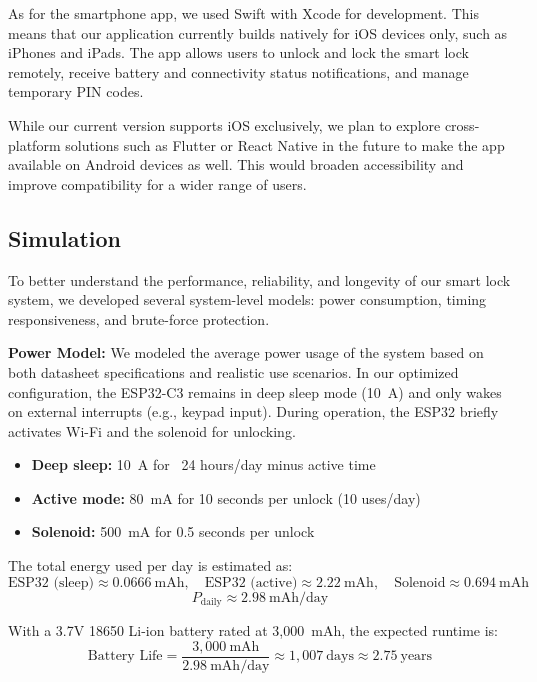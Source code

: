 As for the smartphone app, we used Swift with Xcode for development. This means that our application currently builds natively for iOS devices only, such as iPhones and iPads. The app allows users to unlock and lock the smart lock remotely, receive battery and connectivity status notifications, and manage temporary PIN codes.

While our current version supports iOS exclusively, we plan to explore cross-platform solutions such as Flutter or React Native in the future to make the app available on Android devices as well. This would broaden accessibility and improve compatibility for a wider range of users.

\subsection{Simulation}

To better understand the performance, reliability, and longevity of our smart lock system, we developed several system-level models: power consumption, timing responsiveness, and brute-force protection.

\textbf{Power Model:}  
We modeled the average power usage of the system based on both datasheet specifications and realistic use scenarios. In our optimized configuration, the ESP32-C3 remains in deep sleep mode (10~\textmu A) and only wakes on external interrupts (e.g., keypad input). During operation, the ESP32 briefly activates Wi-Fi and the solenoid for unlocking.

\begin{itemize}
    \item \textbf{Deep sleep:} 10~\textmu A for ~24 hours/day minus active time
    \item \textbf{Active mode:} 80~mA for 10 seconds per unlock (10 uses/day)
    \item \textbf{Solenoid:} 500~mA for 0.5 seconds per unlock
\end{itemize}

The total energy used per day is estimated as:
\[
\text{ESP32 (sleep)} \approx 0.0666~\text{mAh}, \quad
\text{ESP32 (active)} \approx 2.22~\text{mAh}, \quad
\text{Solenoid} \approx 0.694~\text{mAh}
\]
\[
P_{\text{daily}} \approx 2.98~\text{mAh/day}
\]

With a 3.7V 18650 Li-ion battery rated at 3,000~mAh, the expected runtime is:
\[
\text{Battery Life} = \frac{3,000~\text{mAh}}{2.98~\text{mAh/day}} \approx 1,007~\text{days} \approx \boxed{2.75~\text{years}}
\]

